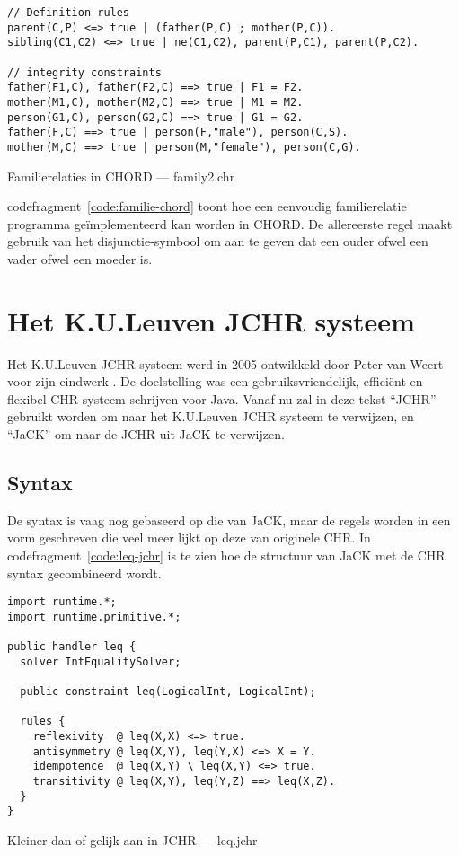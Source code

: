 \begin{exCode}[bhp]
\begin{Verbatim}[frame=single]
// Definition rules
parent(C,P) <=> true | (father(P,C) ; mother(P,C)).
sibling(C1,C2) <=> true | ne(C1,C2), parent(P,C1), parent(P,C2).

// integrity constraints
father(F1,C), father(F2,C) ==> true | F1 = F2.
mother(M1,C), mother(M2,C) ==> true | M1 = M2.
person(G1,C), person(G2,C) ==> true | G1 = G2.
father(F,C) ==> true | person(F,"male"), person(C,S).
mother(M,C) ==> true | person(M,"female"), person(C,G).
\end{Verbatim}
\caption{Familierelaties in CHORD --- family2.chr}
\label{code:familie-chord}
\end{exCode}
codefragment~\ref{code:familie-chord} toont hoe een eenvoudig familierelatie programma ge\"implementeerd kan worden in CHORD. De allereerste regel maakt gebruik van het disjunctie-symbool \code{;} om aan te geven dat een ouder ofwel een vader ofwel een moeder is.

\section{Het K.U.Leuven JCHR systeem}

Het K.U.Leuven JCHR systeem werd in 2005 ontwikkeld door Peter van Weert voor zijn eindwerk \cite{jchr_thesis}. De doelstelling was een gebruiksvriendelijk, effici\"ent en flexibel CHR-systeem schrijven voor Java. Vanaf nu zal in deze tekst ``JCHR'' gebruikt worden om naar het K.U.Leuven JCHR systeem te verwijzen, en ``JaCK'' om naar de JCHR uit JaCK te verwijzen.

\subsection{Syntax}

De syntax is vaag nog gebaseerd op die van JaCK, maar de regels worden in een vorm geschreven die veel meer lijkt op deze van originele CHR. In codefragment~\ref{code:leq-jchr} is te zien hoe de structuur van JaCK met de CHR syntax gecombineerd wordt.
\begin{exCode}
\begin{Verbatim}[frame=single]
import runtime.*;
import runtime.primitive.*;

public handler leq {
  solver IntEqualitySolver;

  public constraint leq(LogicalInt, LogicalInt);

  rules {
    reflexivity  @ leq(X,X) <=> true.
    antisymmetry @ leq(X,Y), leq(Y,X) <=> X = Y.
    idempotence  @ leq(X,Y) \ leq(X,Y) <=> true.
    transitivity @ leq(X,Y), leq(Y,Z) ==> leq(X,Z).
  }
}

\end{Verbatim}
\caption{Kleiner-dan-of-gelijk-aan in JCHR --- leq.jchr}
\label{code:leq-jchr}
\end{exCode}

